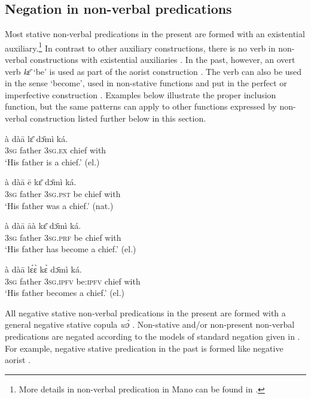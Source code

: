 \documentclass[output=paper,colorlinks,citecolor=brown]{langscibook}
\begin{document}
\subsection{Negation in non-verbal predications}\label{sec:mano:2.3}

Most stative non-verbal predications in the present are formed with an existential auxiliary.\footnote{More details in non-verbal predication in Mano can be found in \citet{KhachaturyanForthcoming}.} In contrast to other auxiliary constructions, there is no verb in non-verbal constructions with existential auxiliaries . In the past, however, an overt verb \textit{kɛ̄} ‘be’ is used as part of the aorist construction . The verb can also be used in the sense ‘become’, used in non-stative functions and put in the perfect  or imperfective construction . Examples below illustrate the proper inclusion function, but the same patterns can apply to other functions expressed by non-verbal construction listed further below in this section.

\ea\label{ex:mano:21}
    \gll à dàā lɛ̄ dɔ̄mì ká.\\
         \textsc{3sg} father \textsc{3sg.ex} chief with\\
    \glt ‘His father is a chief.’ (el.)
\z

\ea\label{ex:mano:22}
    \gll à dàā ē kɛ̄ dɔ̄mì ká.\\
         \textsc{3sg} father \textsc{3sg.pst} be chief with\\
    \glt ‘His father was a chief.’ (nat.)
\z

\ea\label{ex:mano:23}
    \gll à dàā āà kɛ̄ dɔ̄mì ká.\\
         \textsc{3sg} father \textsc{3sg.prf} be chief with\\
    \glt ‘His father has become a chief.’ (el.)
\z

\ea\label{ex:mano:24}
    \gll à dàā lɛ́ɛ̀ kɛ̀ dɔ̄mì ká.\\
         \textsc{3sg} father \textsc{3sg.ipfv} be:\textsc{ipfv}  chief with\\
    \glt ‘His father becomes a chief.’ (el.)
\z

All negative stative non-verbal predications in the present are formed with a general negative stative copula \textit{wɔ́}  \citep{Veselinova2013neg.exist}. Non{}-stative and/or non-present non-verbal predications are negated according to the models of standard negation given in . For example, negative stative predication in the past is formed like negative aorist .
\end{document}

